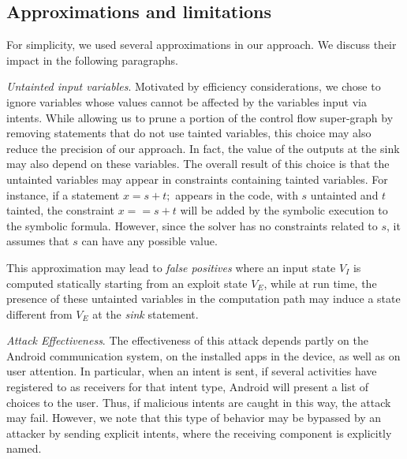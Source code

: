 

\subsection{Approximations and limitations}

For simplicity, we used several approximations in our approach. We discuss their impact in the following paragraphs.

\emph{Untainted input variables}. Motivated by efficiency considerations, we chose to ignore variables whose values cannot be affected by the variables input via intents. While allowing us to prune a portion of the control flow super-graph by removing statements that do not use tainted variables, this choice may also reduce the precision of our approach. In fact, the value of the outputs at the sink may also depend on these variables. {\color{orange} The overall result of this choice is that the untainted variables may appear in constraints containing tainted variables. For instance, if a statement $x=s+t;$ appears in the code, with $s$ untainted and $t$ tainted, the constraint $x==s+t$ will be added by the symbolic execution to the symbolic formula. However, since the solver has no constraints related to $s$, it assumes that $s$ can have any possible value.} 

This approximation may lead to \textit{false positives} where an input state $V_I$ is computed statically starting from an exploit state $V_E$, while at run time, the presence of these untainted variables in the computation path may induce a state different from $V_E$ at the \textit{sink} statement.

{\color{orange}
\emph{Attack Effectiveness}. The effectiveness of this attack depends partly on the Android communication system, on the installed apps in the device, as well as on user attention. In particular, when an intent is sent, if several activities have registered to as receivers for that intent type, Android will present a list of choices to the user. Thus, if malicious intents are caught in this way, the attack may fail. However, we note that this type of behavior may be bypassed by an attacker by sending explicit intents, where the receiving component is explicitly named.}



